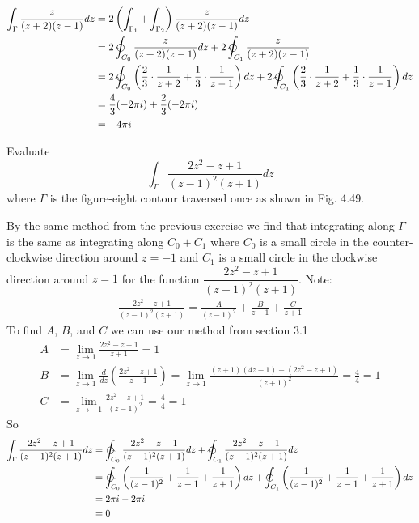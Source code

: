\documentclass[12pt]{article}
\newenvironment{exercise}[2][Exercise]{\begin{trivlist}
\item[\hskip \labelsep {\bfseries #1} \hskip \labelsep {\bfseries #2.}]}{\end{trivlist}}
\begin{document}
\begin{align*}
	\int_{\Gamma} \frac{z}{(z+2)(z-1)}dz &= 2\left(\int_{\Gamma_1} + \int_{\Gamma_2}\right)\frac{z}{(z+2)(z-1)}dz \\
					     &= 2\ointclockwise_{C_0} \frac{z}{(z+2)(z-1)}dz + 2\ointclockwise_{C_1} \frac{z}{(z+2)(z -1)} \\
					     &= 2\ointclockwise_{C_0} \left(\frac{2}{3}\cdot\frac{1}{z+2} + \frac{1}{3}\cdot\frac{1}{z-1}\right)dz + 2\ointclockwise_{C_1} \left(\frac{2}{3}\cdot\frac{1}{z+2} + \frac{1}{3}\cdot\frac{1}{z-1}\right)dz \\
					     &= \frac{4}{3}(-2\pi i) +  \frac{2}{3}(-2\pi i) \\
					     &= -4\pi i
\end{align*}
\begin{exercise}{17}
	Evaluate
	\[
		\int_{\Gamma} \frac{2z^2 - z + 1}{(z-1)^2(z+1)}dz
	\]
	where $\Gamma$ is the figure-eight contour traversed once as shown in Fig. 4.49.
\end{exercise}
By the same method from the previous exercise we find that integrating along $\Gamma$ is the same as integrating along $C_0 + C_1$ where $C_0$ is a small circle in the counter-clockwise direction around $z = -1$ and $C_1$ is a small circle in the clockwise direction around $z = 1$ for the function $\dfrac{2z^2 - z + 1}{(z-1)^2(z+1)}$. Note:
\begin{align*}
	\frac{2z^2 - z + 1}{(z-1)^2(z+1)} = \frac{A}{(z-1)^2} + \frac{B}{z-1} + \frac{C}{z+1}
\end{align*}
To find $A$, $B$, and $C$ we can use our method from section 3.1
\begin{align*}
	A &= \lim_{z \to 1} \frac{2z^2 - z + 1}{z+1} = 1 \\
	B &= \lim_{z \to 1} \frac{d}{dz}\left(\frac{2z^2 - z + 1}{z+1}\right) = \lim_{z \to 1} \frac{(z+1)(4z - 1) - (2z^2 - z + 1)}{(z + 1)^2} = \frac{4}{4} = 1 \\
	C &= \lim_{z \to -1} \frac{2z^2 - z + 1}{(z - 1)^2} = \frac{4}{4} = 1
\end{align*}
So
\begin{align*}
	\int_{\Gamma} \frac{2z^2 - z + 1}{(z-1)^2(z+1)}dz &= \ointctrclockwise_{C_0} \frac{2z^2 - z + 1}{(z-1)^2(z+1)}dz + \ointclockwise_{C_1} \frac{2z^2 - z + 1}{(z - 1)^2(z + 1)}dz \\
							  &= \ointctrclockwise_{C_0}\left(\frac{1}{(z - 1)^2} + \frac{1}{z - 1} + \frac{1}{z + 1}\right)dz + \ointclockwise_{C_1}\left(\frac{1}{(z-1)^2} + \frac{1}{z - 1} + \frac{1}{z + 1}\right)dz \\
							  &= 2\pi i - 2\pi i \\
							  &= 0
\end{align*}
\end{document}
